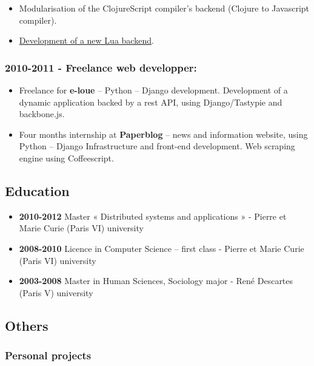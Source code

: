 \documentclass[10pt,letterpaper]{article}
\providecommand{\tightlist}{%
  \setlength{\itemsep}{0pt}\setlength{\parskip}{0pt}}
\begin{document}
\begin{itemize}
\tightlist
\item
  Modularisation of the ClojureScript compiler's backend (Clojure to
  Javascript compiler).
\item
  \href{https://github.com/raph-amiard/clojurescript-lua}{Development of
  a new Lua backend}.
\end{itemize}

\hypertarget{freelance-web-developper}{%
\subsubsection{\texorpdfstring{\textbf{2010-2011} - Freelance web
developper:}{2010-2011 - Freelance web developper:}}\label{freelance-web-developper}}

\begin{itemize}
\item
  Freelance for \textbf{e-loue} -- Python -- Django development.
  Development of a dynamic application backed by a rest API, using
  Django/Tastypie and backbone.js.
\item
  Four months internship at \textbf{Paperblog} -- news and information
  website, using Python -- Django Infrastructure and front-end
  development. Web scraping engine using Coffeescript.
\end{itemize}

\hypertarget{education}{%
\subsection{Education}\label{education}}

\begin{itemize}
\tightlist
\item
  \textbf{2010-2012} Master « Distributed systems and applications » -
  Pierre et Marie Curie (Paris VI) university
\item
  \textbf{2008-2010} Licence in Computer Science -- first class - Pierre
  et Marie Curie (Paris VI) university
\item
  \textbf{2003-2008} Master in Human Sciences, Sociology major - René
  Descartes (Paris V) university
\end{itemize}

\hypertarget{others}{%
\subsection{Others}\label{others}}

\hypertarget{personal-projects}{%
\subsubsection{Personal projects}\label{personal-projects}}
\end{document}
